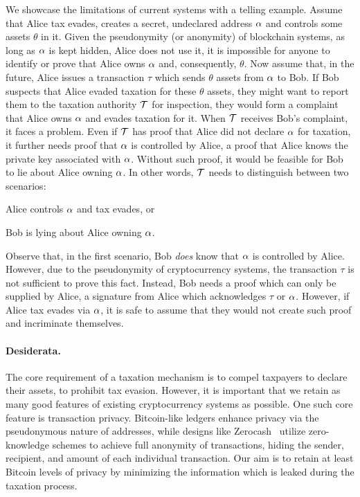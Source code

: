 We showcase the limitations of current systems with a telling example.  Assume
that Alice tax evades, \ie creates a secret, undeclared address $\alpha$ and
controls some assets $\theta$ in it. Given the pseudonymity (or anonymity) of blockchain systems, as long as $\alpha$ is kept hidden, \ie
Alice does not use it, it is impossible for anyone to identify or prove that
Alice owns $\alpha$ and, consequently, $\theta$.
Now assume that, in the future, Alice issues a transaction $\tau$ which
sends $\theta$ assets from $\alpha$ to Bob. If Bob suspects that Alice evaded
taxation for these $\theta$ assets, they might want to report them to the
taxation authority $\mathcal{T}$ for inspection, \ie they would form a complaint
that Alice owns $\alpha$ and evades taxation for it.
When $\mathcal{T}$ receives Bob's complaint, it faces a problem. Even if
$\mathcal{T}$ has proof that Alice did not declare $\alpha$ for taxation, it
further needs proof that $\alpha$ is controlled by Alice, \ie a proof
that Alice knows the private key associated with $\alpha$. Without such
proof, it would be feasible for Bob to lie about Alice owning $\alpha$. In
other words, $\mathcal{T}$ needs to distinguish between two scenarios:
\begin{inparaenum}[i)]
    \item Alice controls $\alpha$ and tax evades, or
    \item Bob is lying about Alice owning $\alpha$.
\end{inparaenum}
Observe that, in the first scenario, Bob \emph{does} know that $\alpha$ is
controlled by Alice. However, due to the pseudonymity of cryptocurrency
systems, the transaction $\tau$ is not sufficient to prove this fact. Instead,
Bob needs a proof which can only be supplied by Alice, \eg a signature from
Alice which acknowledges $\tau$ or $\alpha$. However, if Alice tax evades via
$\alpha$, it is safe to assume that they would not create such proof
and incriminate themselves.

\paragraph{Desiderata.}\label{subsec:desiderata}

The core requirement of a taxation mechanism is to compel taxpayers to declare
their assets, \ie to prohibit tax evasion. However, it is important that we
retain as many good features of existing cryptocurrency systems as possible.
One such core feature is transaction privacy. Bitcoin-like ledgers enhance
privacy via the pseudonymous nature of addresses, while designs like
Zerocash~\cite{SP:BCGGMT14} utilize zero-knowledge schemes to achieve full
anonymity of transactions, \ie hiding the sender, recipient, and amount of each
individual transaction. Our aim is to retain at least Bitcoin levels of privacy
by minimizing the information which is leaked during the taxation process.

